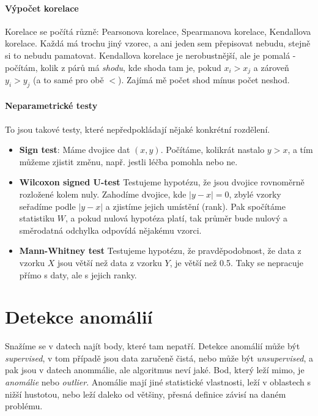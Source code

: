 \documentclass[10pt,a4paper]{article}
\begin{document}
\paragraph{Výpočet korelace} Korelace se počítá různě: Pearsonova korelace, Spearmanova korelace, Kendallova korelace. Každá má trochu jiný vzorec, a ani jeden sem přepisovat nebudu, stejně si to nebudu pamatovat. Kendallova korelace je nerobustnější, ale je pomalá - počítám, kolik z párů má \textit{shodu}, kde shoda tam je, pokud $x_i > x_j$ a zároveň $y_i > y_j$ (a to samé pro obě $<$). Zajímá mě počet shod mínus počet neshod.

\paragraph{Neparametrické testy} To jsou takové testy, které nepředpokládají nějaké konkrétní rozdělení.

\begin{itemize}
\item \textbf{Sign test}: Máme dvojice dat $(x, y)$. Počítáme, kolikrát nastalo $y > x$, a tím můžeme zjistit změnu, např. jestli léčba pomohla nebo ne.
\item \textbf{Wilcoxon signed U-test} Testujeme hypotézu, že jsou dvojice rovnoměrně rozložené kolem nuly. Zahodíme dvojice, kde $|y-x|=0$, zbylé vzorky seřadíme podle $|y-x|$ a zjistíme jejich umístění (rank). Pak spočítáme statistiku $W$, a pokud nulová hypotéza platí, tak průměr bude nulový a směrodatná odchylka odpovídá nějakému vzorci.
\item \textbf{Mann-Whitney test} Testujeme hypotézu, že pravděpodobnost, že data z vzorku $X$ jsou větší než data z vzorku $Y$, je větší než 0.5. Taky se nepracuje přímo s daty, ale s jejich ranky. 
\end{itemize}

\section{Detekce anomálií}

Snažíme se v datech najít body, které tam nepatří. Detekce anomálií může být \textit{supervised}, v tom případě jsou data zaručeně čistá, nebo může být \textit{unsupervised}, a pak jsou v datech anommálie, ale algoritmus neví jaké. Bod, který leží mimo, je \textit{anomálie} nebo \textit{outlier}. Anomálie mají jiné statistické vlastnosti, leží v oblastech s nižší hustotou, nebo leží daleko od většiny, přesná definice závisí na daném problému.
\end{document}
